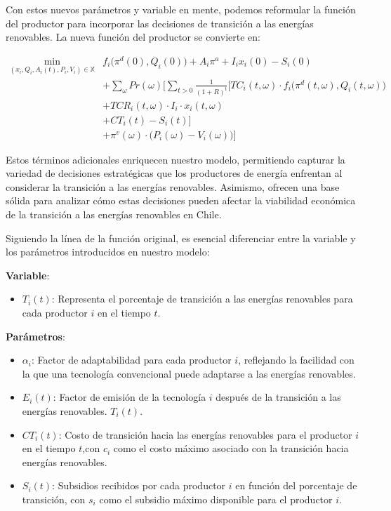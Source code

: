 Con estos nuevos parámetros y variable en mente, podemos reformular la función del productor para incorporar las decisiones de transición a las energías renovables. La nueva función del productor se convierte en:\vspace{2.5mm}

\begin{align}
\min_{(x_i,Q_i,A_i(t),P_i,V_i)\in \mathbb{X}} & f_i \big( \pi^d(0),Q_i(0)\big)+ A_i\pi^{a} + I_i x_i(0) - S_i(0) \nonumber \\
& + \sum_{\omega} Pr(\omega) \Bigg[ \sum_{t>0} \frac{1}{(1+R)^t} \Big[ TC_i(t,\omega)\cdot f_i \big( \pi^d(t,\omega),Q_i(t,\omega) \big) \nonumber \\
& + TCR_i(t,\omega) \cdot I_i\cdot x_i(t,\omega) \nonumber \\
& + CT_i(t)  - S_i(t) \Big] \nonumber \\
& + \pi^v(\omega)\cdot \big(P_i(\omega)-V_i(\omega)\big) \Bigg] \label{3.6.1}
\end{align}

Estos términos adicionales enriquecen nuestro modelo, permitiendo capturar la variedad de decisiones estratégicas que los productores de energía enfrentan al considerar la transición a las energías renovables. Asimismo, ofrecen una base sólida para analizar cómo estas decisiones pueden afectar la viabilidad económica de la transición a las energías renovables en Chile.\vspace{2.5mm}

Siguiendo la línea de la función original, es esencial diferenciar entre la variable y los parámetros introducidos en nuestro modelo:

\textbf{Variable}:
\begin{itemize}
    \item \( T_i(t) \): Representa el porcentaje de transición a las energías renovables para cada productor \( i \) en el tiempo \( t \).

\end{itemize}

\textbf{Parámetros}:
\begin{itemize}
    \item \( \alpha_i \): Factor de adaptabilidad para cada productor \( i \), reflejando la facilidad con la que una tecnología convencional puede adaptarse a las energías renovables.
    \item \( E_i(t) \): Factor de emisión de la tecnología \( i \) después de la transición a las energías renovables.
     \( T_i(t) \).
    \item \( CT_i(t) \): Costo de transición hacia las energías renovables para el productor \( i \) en el tiempo \( t \),con \( c_i \) como el costo máximo asociado con la transición hacia energías renovables.
    \item \( S_i(t) \): Subsidios recibidos por cada productor \( i \) en función del porcentaje de transición, con \( s_i \) como el subsidio máximo disponible para el productor \( i \).
\end{itemize}

